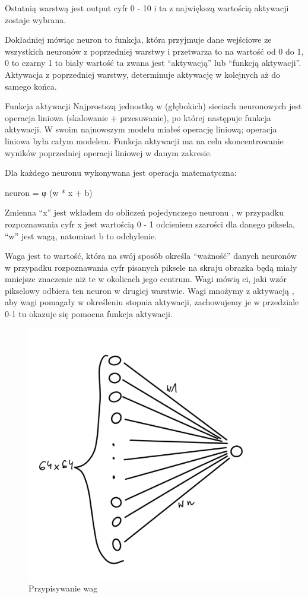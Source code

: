 \documentclass[brudnopis]{xmgr}
\begin{document}
Ostatnią warstwą jest output cyfr 0 - 10 i ta z największą wartością aktywacji zostaje wybrana. 

Dokładniej mówiąc neuron to funkcja, która przyjmuje dane wejściowe ze wszystkich neuronów z poprzedniej warstwy i przetwarza to na wartość od 0 do 1,
0 to czarny 1 to biały wartość ta zwana jest “aktywacją” lub “funkcją aktywacji”.
Aktywacja z poprzedniej warstwy, determinuje aktywację w kolejnych aż do samego końca. 

Funkcja aktywacji Najprostszą jednostką w (głębokich) sieciach neuronowych jest operacja liniowa (skalowanie + przesuwanie), po której następuje funkcja aktywacji. W swoim najnowszym modelu miałeś operację liniową; operacja liniowa była całym modelem. Funkcja aktywacji ma na celu skoncentrowanie wyników poprzedniej operacji liniowej w danym zakresie.

Dla każdego neuronu wykonywana jest operacja matematyczna:



neuron  = φ (w * x + b)



 Zmienna “x” jest wkładem do obliczeń pojedynczego neuronu , w przypadku rozpoznawania cyfr x jest wartością 0 - 1 odcieniem szarości dla danego piksela, “w” jest wagą, natomiast b to odchylenie.


Waga jest to wartość, która na swój sposób określa “ważność” danych neuronów w przypadku rozpoznawania cyfr pisanych piksele na skraju obrazka będą miały mniejsze znaczenie niż te w okolicach jego centrum. Wagi mówią ci, jaki wzór pikselowy odbiera ten neuron w drugiej warstwie. Wagi mnożymy z aktywacją ,  aby wagi pomagały w określeniu stopnia aktywacji, zachowujemy je w przedziale 0-1 tu okazuje się pomocna funkcja aktywacji.

\begin{figure}[!tbh]
\centering
\includegraphics[width=.8\hsize]{fig/3}
\caption{Przypisywanie wag\label{RYS.3}}
\end{figure}
\end{document}
